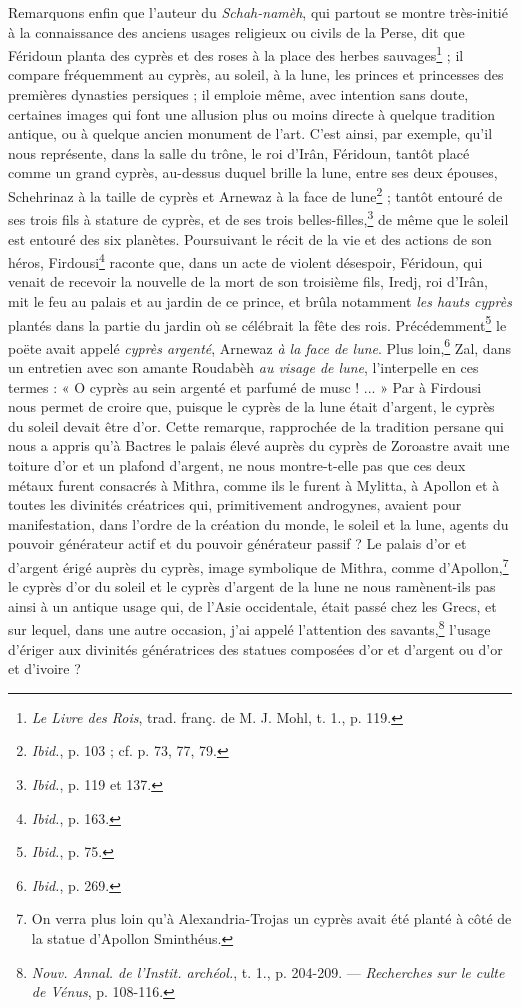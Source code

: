 \documentclass[a4paper, 11pt, oneside, polutonikogreek, french]{article}
\begin{document}
Remarquons enfin que l'auteur du \emph{Schah-namèh}, qui partout se montre très-initié à la connaissance des anciens usages religieux ou civils de la Perse, dit que Féridoun planta des cyprès et des roses à la place des herbes sauvages\footnote{\emph{Le Livre des Rois}, trad. franç. de M. J. Mohl, t. 1., p. 119.} ; il compare fréquemment au cyprès, au soleil, à la lune, les princes et princesses des premières dynasties persiques ; il emploie même, avec intention sans doute, certaines images qui font une allusion plus ou moins directe à quelque tradition antique, ou à quelque ancien monument de l'art. C'est ainsi, par exemple, qu'il nous représente, dans la salle du trône, le roi d'Irân, Féridoun, tantôt placé comme un grand cyprès, au-dessus duquel brille la lune, entre ses deux épouses, Schehrinaz à la taille de cyprès et Arnewaz à la face de lune\footnote{\emph{Ibid.}, p. 103 ; cf. p. 73, 77, 79.} ; tantôt entouré de ses trois fils à stature de cyprès, et de ses trois belles-filles,\footnote{\emph{Ibid.}, p. 119 et 137.} de même que le soleil est entouré des six planètes. Poursuivant le récit de la vie et des actions de son héros, Firdousi\footnote{\emph{Ibid.}, p. 163.} raconte que, dans un acte de violent désespoir, Féridoun, qui venait de recevoir la nouvelle de la mort de son troisième fils, Iredj, roi d'Irân, mit le feu au palais et au jardin de ce prince, et brûla notamment \emph{les hauts cyprès} plantés dans la partie du jardin où se célébrait la fête des rois. Précédemment\footnote{\emph{Ibid.}, p. 75.} le poëte avait appelé \emph{cyprès argenté}, Arnewaz \emph{à la face de lune}. Plus loin,\footnote{\emph{Ibid.}, p. 269.} Zal, dans un entretien avec son amante Roudabèh \emph{au visage de lune}, l'interpelle en ces termes : « O cyprès au sein argenté et parfumé de musc ! ... » Par à Firdousi nous permet de croire que, puisque le cyprès de la lune était d'argent, le cyprès du soleil devait être d'or. Cette remarque, rapprochée de la tradition persane qui nous a appris qu'à Bactres le palais élevé auprès du cyprès de Zoroastre avait une toiture d'or et un plafond d'argent, ne nous montre-t-elle pas que ces deux métaux furent consacrés à Mithra, comme ils le furent à Mylitta, à Apollon et à toutes les divinités créatrices qui, primitivement androgynes, avaient pour manifestation, dans l'ordre de la création du monde, le soleil et la lune, agents du pouvoir générateur actif et du pouvoir générateur passif ? Le palais d'or et d'argent érigé auprès du cyprès, image symbolique de Mithra, comme d'Apollon,\footnote{On verra plus loin qu'à Alexandria-Trojas un cyprès avait été planté à côté de la statue d'Apollon Sminthéus.} le cyprès d'or du soleil et le cyprès d'argent de la lune ne nous ramènent-ils pas ainsi à un antique usage qui, de l'Asie occidentale, était passé chez les Grecs, et sur lequel, dans une autre occasion, j'ai appelé l'attention des savants,\footnote{\emph{Nouv. Annal. de l'Instit. archéol.}, t. 1., p. 204-209. --- \emph{Recherches sur le culte de Vénus}, p. 108-116.} l'usage d'ériger aux divinités génératrices des statues composées d'or et d'argent ou d'or et d'ivoire ?
\end{document}

